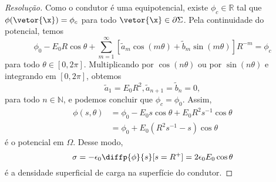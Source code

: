 \begin{proof}[Resolução]
    Como o condutor é uma equipotencial, existe \(\phi_c \in \mathbb{R}\) tal que \(\phi(\vetor{\x}) = \phi_c\) para todo \(\vetor{\x} \in \partial \Sigma\). Pela continuidade do potencial, temos
    \begin{equation*}
        \phi_0 - E_0R \cos\theta + \sum_{m = 1}^\infty \left[\tilde{a}_m \cos(m\theta) + \tilde{b}_m\sin(m\theta)\right]R^{-m} = \phi_c
    \end{equation*}
    para todo \(\theta \in [0,2\pi]\). Multiplicando por \(\cos(n\theta)\) ou por \(\sin(n\theta)\) e integrando em \([0,2\pi]\), obtemos
    \begin{equation*}
        \tilde{a}_1 = E_0R^2, \tilde{a}_{n+1}=\tilde{b}_n = 0,
    \end{equation*}
    para todo \(n \in \mathbb{N}\), e podemos concluir que \(\phi_c = \phi_0\). Assim,
    \begin{align*}
        \phi(s, \theta) &= \phi_0 - E_0s \cos\theta + E_0R^2s^{-1}\cos\theta\\
                        &= \phi_0 + E_0 \left(R^2s^{-1} - s\right)\cos\theta
    \end{align*}
    é o potencial em \(\Omega\). Desse modo,
    \begin{equation*}
        \sigma = -\epsilon_0 \diffp{\phi}{s}[s=R^+] = 2 \epsilon_0 E_0\cos\theta
    \end{equation*}
    é a densidade superficial de carga na superfície do condutor.
\end{proof}
